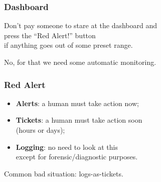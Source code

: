 \begin{frame}
\frametitle{Dashboard}

\large
\begin{changemargin}{1cm}

Don't pay someone to stare at the dashboard and\\
press the  ``Red Alert!'' button \\
if anything goes out of some preset range.

No, for that we need some automatic monitoring.
\end{changemargin}

\end{frame}



\begin{frame}
\frametitle{Red Alert}

\large
\begin{changemargin}{1cm}
\begin{itemize}
\item {\bf Alerts}: a human must take action now;
\item {\bf Tickets}: a human must take action soon \\ \qquad (hours or days);
\item {\bf Logging}: no need to look at this \\ \qquad except for forensic/diagnostic purposes.
\end{itemize}


Common bad situation: logs-as-tickets.
\end{changemargin}
\end{frame}



{
\begin{frame}[plain]

\end{frame}
}

